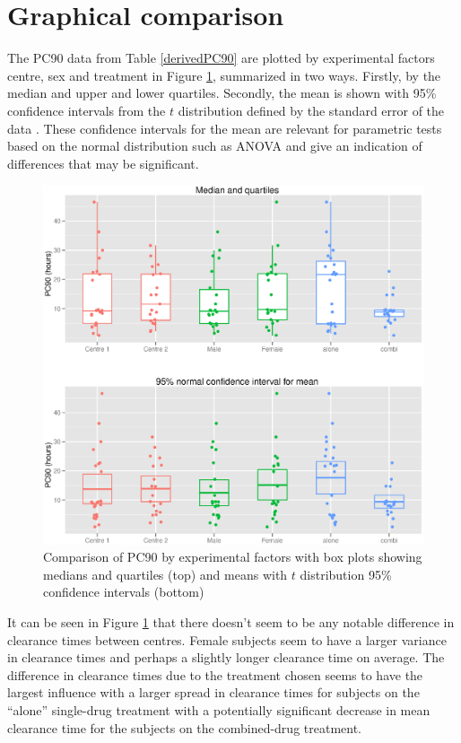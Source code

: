\section{Graphical comparison}
The PC90 data from Table \ref{derivedPC90} are plotted by experimental factors centre, sex and treatment in Figure \ref{pc90boxes}, summarized in two ways. Firstly, by the median and upper and lower quartiles. Secondly, the mean is shown with 95\% confidence intervals from the $t$ distribution defined by the standard error of the data%
. These confidence intervals for the mean are relevant for parametric tests based on the normal distribution such as ANOVA and give an indication of differences that may be significant.
\begin{figure}[h]
\includegraphics[width=150mm]{pc90boxes.eps} 
\caption{Comparison of PC90 by experimental factors with box plots showing medians and quartiles (top) and means with $t$ distribution 95\% confidence intervals (bottom)}
\label{pc90boxes}
\end{figure}

It can be seen in Figure \ref{pc90boxes} that there doesn't seem to be any notable difference in clearance times between centres. Female subjects seem to have a larger variance in clearance times and perhaps a slightly longer clearance time on average. The difference in clearance times due to the treatment chosen seems to have the largest influence with a larger spread in clearance times for subjects on the ``alone'' single-drug treatment with a potentially significant decrease in mean clearance time for the subjects on the combined-drug treatment.

